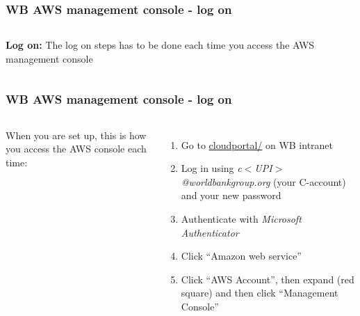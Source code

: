 \documentclass[aspectratio=169]{beamer} %
\begin{document}
\begin{frame}
	\frametitle{WB AWS management console - log on}
	\begin{columns}[c]
		
		
		\textbf{Log on:} The log on steps has to be done each time you access the AWS management console
		
	\end{columns}
\end{frame}

\begin{frame}
	\frametitle{WB AWS management console - log on}

	\begin{columns}[c]


		When you are set up, this is how you access the AWS console each time:

		\begin{enumerate}
			\item Go to \href{https://cloudportal.worldbank.org/}{cloudportal/}
			on WB intranet
			\item Log in using \textit{c$<$UPI$>$@worldbankgroup.org}
			(your C-account) and your new password
			\item Authenticate with \textit{Microsoft Authenticator}
			\item Click ``Amazon web service''
			\item Click ``AWS Account'', then expand (red square) and then click ``Management Console''

		\end{enumerate}


\end{columns}
\end{frame}
\end{document}
